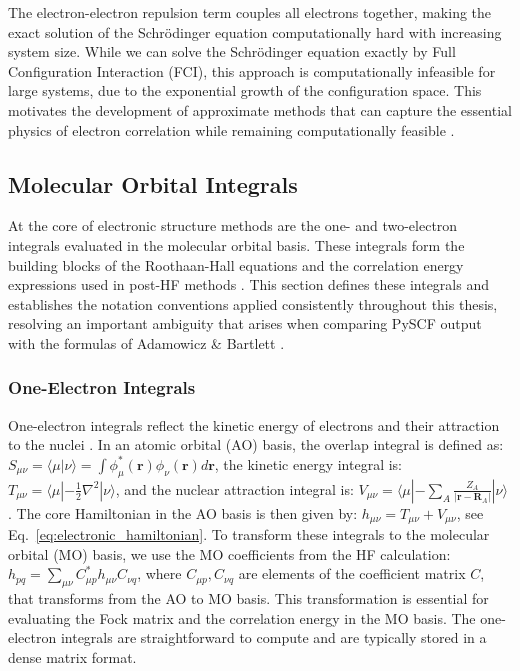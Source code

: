 The electron-electron repulsion term couples all electrons together, making the exact solution of the Schrödinger equation computationally hard with increasing system size. While we can solve the Schrödinger equation exactly by Full Configuration Interaction (FCI), this approach is computationally infeasible for large systems, due to the exponential growth of the configuration space. This motivates the development of approximate methods that can capture the essential physics of electron correlation while remaining computationally feasible \cite{SzaboOstlund1989, Jensen2017}.

\subsection{Molecular Orbital Integrals}
\label{subsec:theory_mo_integrals}

At the core of electronic structure methods are the one- and two-electron integrals evaluated in the molecular orbital basis. These integrals form the building blocks of the Roothaan-Hall equations and the correlation energy expressions used in post-HF methods \cite{Helgaker2000}. This section defines these integrals and establishes the notation conventions applied consistently throughout this thesis, resolving an important ambiguity that arises when comparing PySCF output with the formulas of Adamowicz \& Bartlett \cite{Adamowicz1987}.

\subsubsection{One-Electron Integrals}
\label{subsubsec:theory_mo_integrals_one_electron}

One-electron integrals reflect the kinetic energy of electrons and their attraction to the nuclei \cite{Helgaker2000}. In an atomic orbital (AO) basis, the overlap integral is defined as:  $S_{\mu\nu} = \langle \mu | \nu \rangle = \int \phi_\mu^*(\mathbf{r}) \phi_\nu(\mathbf{r}) d\mathbf{r}$, the kinetic energy integral is: $T_{\mu\nu} = \langle \mu | -\frac{1}{2} \nabla^2 | \nu \rangle$, and the nuclear attraction integral is: $V_{\mu\nu} = \langle \mu | -\sum_A \frac{Z_A}{|\mathbf{r} - \mathbf{R}_A|} | \nu \rangle$ \cite{Helgaker2000}. The core Hamiltonian in the AO basis is then given by: $h_{\mu\nu} = T_{\mu\nu} + V_{\mu\nu}$, see Eq.~\ref{eq:electronic_hamiltonian}. To transform these integrals to the molecular orbital (MO) basis, we use the MO coefficients from the HF calculation: $h_{pq} = \sum_{\mu\nu} C_{\mu p}^* h_{\mu\nu} C_{\nu q}$, where $C_{\mu p}, C_{\nu q}$ are elements of the coefficient matrix $C$, that transforms from the AO to MO basis. This transformation is essential for evaluating the Fock matrix and the correlation energy in the MO basis. The one-electron integrals are straightforward to compute \cite{Sun2020} and are typically stored in a dense matrix format.

